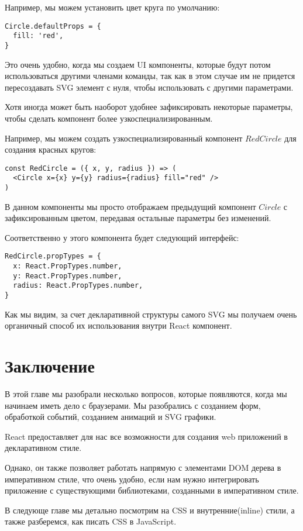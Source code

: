 Например, мы можем установить цвет круга по умолчанию:

\begin{lstlisting}
Circle.defaultProps = {
  fill: 'red',
}
\end{lstlisting}

Это очень удобно, когда мы создаем UI компоненты, которые будут потом использоваться другими членами команды, так как в этом случае им не придется пересоздавать SVG элемент с нуля, чтобы использовать с другими параметрами.

Хотя иногда может быть наоборот удобнее зафиксировать некоторые параметры, чтобы сделать компонент более узкоспециализированным.

Например, мы можем создать узкоспециализированный компонент $RedCircle$ для создания красных кругов:

\begin{lstlisting}
const RedCircle = ({ x, y, radius }) => (
  <Circle x={x} y={y} radius={radius} fill="red" />
)
\end{lstlisting}

В данном компоненты мы просто отображаем предыдущий компонент $Circle$ с зафиксированным цветом, передавая остальные параметры без изменений.

Соответственно у этого компонента будет следующий интерфейс:

\begin{lstlisting}
RedCircle.propTypes = {
  x: React.PropTypes.number,
  y: React.PropTypes.number,
  radius: React.PropTypes.number,
}
\end{lstlisting}

Как мы видим, за счет декларативной структуры самого SVG мы получаем очень органичный способ их использования внутри React компонент.

\section{Заключение}

В этой главе мы разобрали несколько вопросов, которые появляются, когда мы начинаем иметь дело с браузерами. Мы разобрались с созданием форм, обработкой событий, созданием анимаций и SVG графики.

React предоставляет для нас все возможности для создания web приложений в декларативном стиле. 

Однако, он также позволяет работать напрямую с элементами DOM дерева в императивном стиле, что очень удобно, если нам нужно интегрировать приложение с существующими библиотеками, созданными в императивном стиле.

В следующе главе мы детально посмотрим на CSS и внутренние(inline) стили, а также разберемся, как писать CSS в JavaScript.



